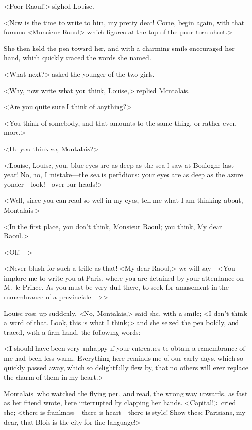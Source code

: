 <Poor Raoul!> sighed Louise.

<Now is the time to write to him, my pretty dear! Come, begin again, with that famous <Monsieur Raoul> which figures at the top of the poor torn sheet.>

She then held the pen toward her, and with a charming smile encouraged her hand, which quickly traced the words she named.

<What next?> asked the younger of the two girls.

<Why, now write what you think, Louise,> replied Montalais.

<Are you quite sure I think of anything?>

<You think of somebody, and that amounts to the same thing, or rather even more.>

<Do you think so, Montalais?>

<Louise, Louise, your blue eyes are as deep as the sea I saw at Boulogne last year! No, no, I mistake—the sea is perfidious: your eyes are as deep as the azure yonder—look!—over our heads!>

<Well, since you can read so well in my eyes, tell me what I am thinking about, Montalais.>

<In the first place, you don't think, Monsieur Raoul; you think, My dear Raoul.>

<Oh!—>

<Never blush for such a trifle as that! <My dear Raoul,> we will say—<You implore me to write you at Paris, where you are detained by your attendance on M.~le Prince. As you must be very dull there, to seek for amusement in the remembrance of a provinciale—>>

Louise rose up suddenly. <No, Montalais,> said she, with a smile; <I don't think a word of that. Look, this is what I think;> and she seized the pen boldly, and traced, with a firm hand, the following words:

<I should have been very unhappy if your entreaties to obtain a remembrance of me had been less warm. Everything here reminds me of our early days, which so quickly passed away, which so delightfully flew by, that no others will ever replace the charm of them in my heart.>

Montalais, who watched the flying pen, and read, the wrong way upwards, as fast as her friend wrote, here interrupted by clapping her hands. <Capital!> cried she; <there is frankness—there is heart—there is style! Show these Parisians, my dear, that Blois is the city for fine language!>

